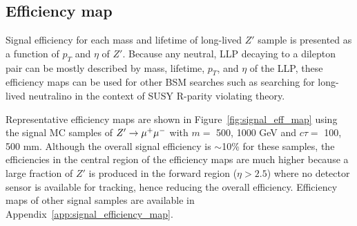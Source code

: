 \subsection{Efficiency map}
\label{sec:efficiency_map}
Signal efficiency for each mass and lifetime of long-lived $Z'$ sample is presented as a function of $p_{T}$ and $\eta$ of $Z'$. Because any neutral, LLP decaying to a dilepton pair can be mostly described by mass, lifetime, $p_{T}$, and $\eta$ of the LLP, these efficiency maps can be used for other BSM searches such as searching for long-lived neutralino in the context of SUSY R-parity violating theory.

Representative efficiency maps are shown in Figure~\ref{fig:signal_eff_map} using the signal MC samples of $Z' \rightarrow \mu^{+}\mu^{-}$ with $m=$ 500, 1000 GeV and $c\tau=$ 100, 500 mm. Although the overall signal efficiency is $\sim$10\% for these samples, the efficiencies in the central region of the efficiency maps are much higher because a large fraction of $Z'$ is produced in the forward region ($\eta > 2.5$) where no detector sensor is available for tracking, hence reducing the overall efficiency. Efficiency maps of other signal samples are available in Appendix~\ref{app:signal_efficiency_map}.

